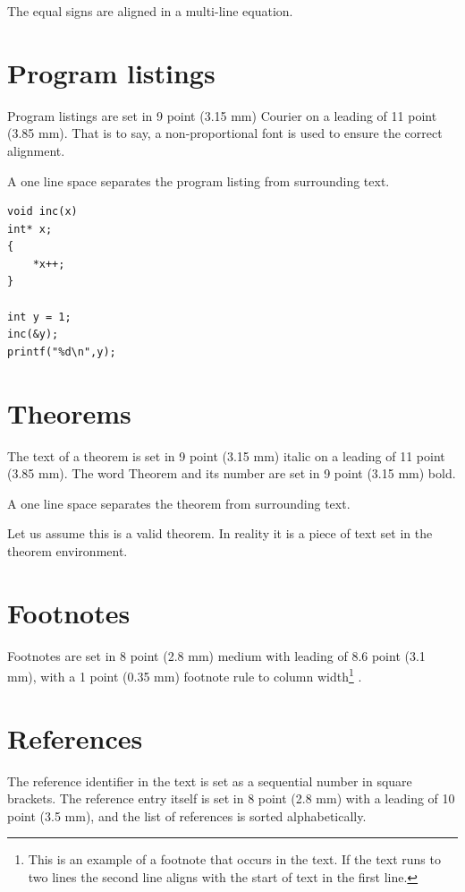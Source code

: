 \documentclass{ecai}
\begin{document}
The equal signs are aligned in a multi-line equation.

\section{Program listings}
Program listings are set in 9 point (3.15 mm) Courier on a
leading of 11 point (3.85 mm). That is to say, a non-proportional
font is used to ensure the correct alignment.

A one line space separates the program listing from surrounding text.

\begin{verbatim}
void inc(x)
int* x;
{
    *x++;
}

int y = 1;
inc(&y);
printf("%d\n",y);
\end{verbatim}

\section{Theorems}
The text of a theorem is set in 9 point (3.15 mm) italic on a
leading of 11 point (3.85 mm). The word Theorem and its number
are set in 9 point (3.15 mm) bold.

A one line space separates the theorem from surrounding text.

\begin{theorem}
Let us assume this is a valid theorem. In reality it is a piece
of text set in the theorem environment.
\end{theorem}

\section{Footnotes}
Footnotes are set in 8 point (2.8 mm) medium with leading of 8.6 point (3.1
mm), with a 1 point (0.35 mm) footnote rule to column
width\footnote{This is an example of a footnote that occurs in
the text. If the text runs to two lines the second line aligns
with the start of text in the first line.} .

\section{References}
The reference identifier in the text is set as a sequential number in square brackets. The reference entry itself is set in 8 point (2.8 mm) with a leading of 10 point (3.5 mm), and the list of references is sorted alphabetically.
\end{document}
